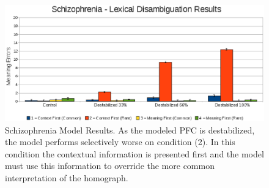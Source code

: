 \documentclass[man]{apa}
\begin{document}



\begin{figure}[tp]
\begin{center}
	\includegraphics[width=140mm]{graphs/schiz_lexamb_results.eps}
\end{center}
\caption{Schizophrenia Model Results. As the modeled PFC is destabilized, the model performs selectively worse on condition (2).  In this condition the contextual information is presented first and the model must use this information to override the more common interpretation of the homograph. } 
\label{Schiz-Amb-Results}
\end{figure} 
\end{document}
